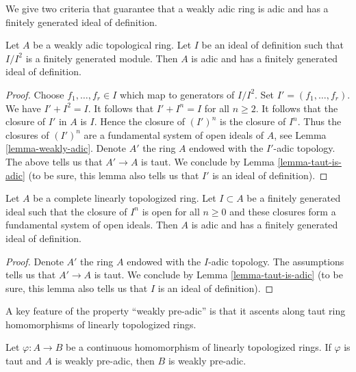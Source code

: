 \noindent
We give two criteria that guarantee that a weakly adic ring
is adic and has a finitely generated ideal of definition.

\begin{lemma}
\label{lemma-weakly-admissible-finite-generation}
Let $A$ be a weakly adic topological ring. Let $I$ be an
ideal of definition such that $I/I^2$ is a finitely generated
module. Then $A$ is adic and has a finitely generated ideal
of definition.
\end{lemma}

\begin{proof}
Choose $f_1, \ldots, f_r \in I$ which map to generators of $I/I^2$.
Set $I' = (f_1, \ldots, f_r)$. We have $I' + I^2 = I$.
It follows that $I' + I^n = I$ for all $n \geq 2$. It follows that the
closure of $I'$ in $A$ is $I$. Hence the closure of
$(I')^n$ is the closure of $I^n$. Thus the closures of $(I')^n$
are a fundamental system of open ideals of $A$, see
Lemma \ref{lemma-weakly-adic}.
Denote $A'$ the ring $A$ endowed with the $I'$-adic topology.
The above tells us that $A' \to A$ is taut.
We conclude by Lemma \ref{lemma-taut-is-adic} (to be sure, this
lemma also tells us that $I'$ is an ideal of definition).
\end{proof}

\begin{lemma}
\label{lemma-weakly-admissible-finite-generation-bis}
Let $A$ be a complete linearly topologized ring. Let $I \subset A$ be a
finitely generated ideal such that the closure of $I^n$ is open for all
$n \geq 0$ and these closures form a fundamental system of open ideals.
Then $A$ is adic and has a finitely generated ideal of definition.
\end{lemma}

\begin{proof}
Denote $A'$ the ring $A$ endowed with the $I$-adic topology.
The assumptions tells us that $A' \to A$ is taut.
We conclude by Lemma \ref{lemma-taut-is-adic} (to be sure, this
lemma also tells us that $I$ is an ideal of definition).
\end{proof}

\noindent
A key feature of the property ``weakly pre-adic'' is that it ascents
along taut ring homomorphisms of linearly topologized rings.

\begin{lemma}
\label{lemma-ascent-taut-weakly-adic}
Let $\varphi : A \to B$ be a continuous homomorphism of
linearly topologized rings. If $\varphi$ is taut and $A$
is weakly pre-adic, then $B$ is weakly pre-adic.
\end{lemma}

